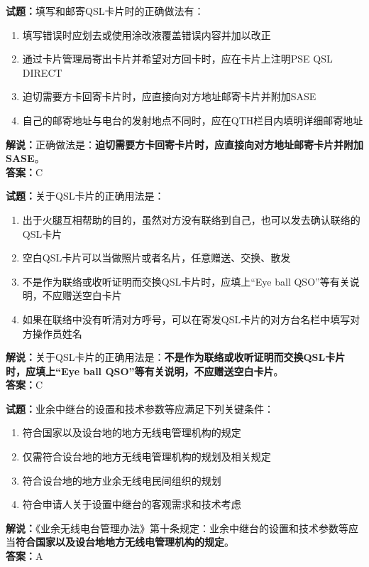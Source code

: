 \documentclass{ctexbook}
\begin{document}
\bigskip


\noindent\textbf{试题：}填写和邮寄QSL卡片时的正确做法有：
\begin{enumerate}[leftmargin=3em]
	\item 填写错误时应划去或使用涂改液覆盖错误内容并加以改正
	\item 通过卡片管理局寄出卡片并希望对方回卡时，应在卡片上注明PSE QSL DIRECT
	\item 迫切需要方卡回寄卡片时，应直接向对方地址邮寄卡片并附加SASE
	\item 自己的邮寄地址与电台的发射地点不同时，应在QTH栏目内填明详细邮寄地址
\end{enumerate}
\noindent\textbf{解说：}正确做法是：\textbf{迫切需要方卡回寄卡片时，应直接向对方地址邮寄卡片并附加SASE}。\\\noindent\textbf{答案：}C



\bigskip


\noindent\textbf{试题：}关于QSL卡片的正确用法是：
\begin{enumerate}[leftmargin=3em]
	\item 出于火腿互相帮助的目的，虽然对方没有联络到自己，也可以发去确认联络的QSL卡片
	\item 空白QSL卡片可以当做照片或者名片，任意赠送、交换、散发
	\item 不是作为联络或收听证明而交换QSL卡片时，应填上“Eye ball QSO”等有关说明，不应赠送空白卡片
	\item 如果在联络中没有听清对方呼号，可以在寄发QSL卡片的对方台名栏中填写对方操作员姓名
\end{enumerate}
\noindent\textbf{解说：}关于QSL卡片的正确用法是：\textbf{不是作为联络或收听证明而交换QSL卡片时，应填上“Eye ball QSO”等有关说明，不应赠送空白卡片}。\\\noindent\textbf{答案：}C



\bigskip


\noindent\textbf{试题：}业余中继台的设置和技术参数等应满足下列关键条件：
\begin{enumerate}[leftmargin=3em]
	\item 符合国家以及设台地的地方无线电管理机构的规定
	\item 仅需符合设台地的地方无线电管理机构的规划及相关规定
	\item 符合设台地的地方业余无线电民间组织的规划
	\item 符合申请人关于设置中继台的客观需求和技术考虑
\end{enumerate}
\noindent\textbf{解说：}《业余无线电台管理办法》第十条规定：业余中继台的设置和技术参数等应当\textbf{符合国家以及设台地地方无线电管理机构的规定}。\\\noindent\textbf{答案：}A
\end{document}
